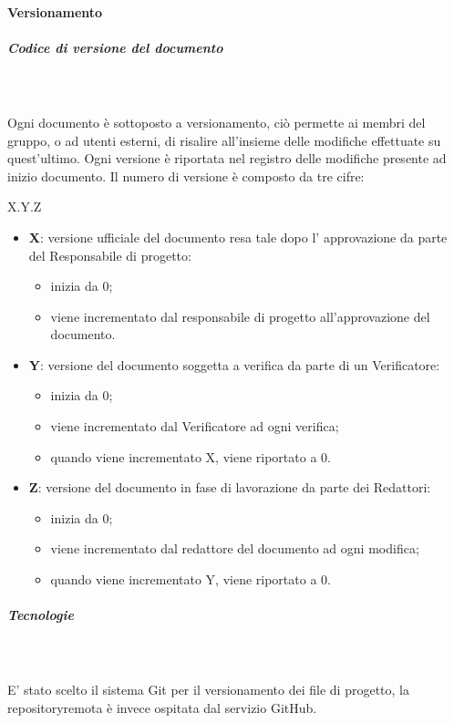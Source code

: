 	\paragraph{Versionamento}
	\subparagraph{Codice di versione del documento} \mbox{}\\ \mbox{}\\
	Ogni documento è sottoposto a versionamento, ciò permette ai membri del gruppo, o ad utenti esterni, di risalire all'insieme delle modifiche effettuate su quest'ultimo. Ogni versione è riportata nel registro delle modifiche presente ad inizio documento.
	Il numero di versione è composto da tre cifre:
	\begin{center}
		X.Y.Z
	\end{center}
	\begin{itemize}
		\item \textbf{X}: versione ufficiale del documento resa tale dopo l' approvazione da parte del Responsabile di progetto:
		\begin{itemize}
			\item inizia da 0;
			\item viene incrementato dal responsabile di progetto all'approvazione del documento.
		\end{itemize}
		\item \textbf{Y}: versione del documento soggetta a verifica da parte di un Verificatore:
		\begin{itemize}
			\item inizia da 0;
			\item viene incrementato dal Verificatore ad ogni verifica;
			\item quando viene incrementato X, viene riportato a 0.
		\end{itemize}
		\item \textbf{Z}: versione del documento in fase di lavorazione da parte dei Redattori:
		\begin{itemize}
			\item inizia da 0;
			\item viene incrementato dal redattore del documento ad ogni modifica;
			\item quando viene incrementato Y, viene riportato a 0.
		\end{itemize}			
	\end{itemize}
	\subparagraph{Tecnologie} \mbox{}\\ \mbox{}\\
	E' stato scelto il sistema Git per il versionamento dei file di progetto, la repository\glosp remota è invece ospitata dal servizio GitHub\glo. 
